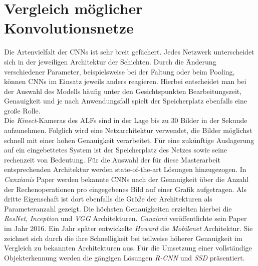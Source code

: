 		\section{Vergleich möglicher Konvolutionsnetze}
		\label{sec: cnns}
		Die Artenvielfalt der CNNs ist sehr breit gefächert. Jedes Netzwerk unterscheidet sich in der jeweiligen Architektur der Schichten. Durch die Änderung verschiedener Parameter, beispielsweise bei der Faltung oder beim Pooling, können CNNs im Einsatz jeweils anders reagieren. Hierbei entscheidet man bei der Auswahl des Modells häufig unter den Gesichtspunkten Bearbeitungszeit, Genauigkeit und je nach Anwendungsfall spielt der Speicherplatz ebenfalls eine große Rolle.\\
		
		Die \textit{Kinect}-Kameras des ALFs sind in der Lage bis zu 30 Bilder in der Sekunde aufzunehmen. Folglich wird eine Netzarchitektur verwendet, die Bilder möglichst schnell mit einer hohen Genauigkeit verarbeitet. Für eine zukünftige Auslagerung auf ein eingebettetes System ist der Speicherplatz des Netzes sowie seine rechenzeit von Bedeutung. Für die Auswahl der für diese Masterarbeit entsprechenden Architektur werden state-of-the-art Lösungen hinzugezogen. In \textit{Canzianis} Paper \cite{cnnvergleich} werden bekannte CNNs nach der Genauigkeit über die Anzahl der Rechenoperationen pro eingegebenes Bild auf einer Grafik aufgetragen. Als dritte Eigenschaft ist dort ebenfalls die Größe der Architekturen als Parameteranzahl gezeigt. Die höchsten Genauigkeiten erzielten hierbei die \textit{ResNet}, \textit{Inception} und \textit{VGG} Architekturen. \textit{Canziani} veröffentlichte sein Paper im Jahr 2016. Ein Jahr später entwickelte \textit{Howard} \cite{mobilenets} die \textit{Mobilenet} Architektur. Sie zeichnet sich durch die ihre Schnelligkeit bei teilweise höherer Genauigkeit im Vergleich zu bekannten Architekturen aus.        Für die Umsetzung einer vollständige Objekterkennung werden die gängigen Lösungen \textit{R-CNN} und \textit{SSD} präsentiert.\\
		
